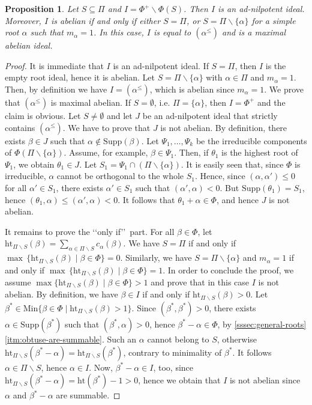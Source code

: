 \documentclass[10pt]{amsart}
\newtheorem{pro}[thm]{Proposition}
\theoremstyle{definition}
\theoremstyle{remark}
\newcommand\smeno{\smallsetminus}
\newcommand\Min{\mathrm{Min}}
\newcommand\supp{\mathrm{Supp}}
\newcommand\alt{\mathrm{ht}}
\newcommand\al{\alpha}
\newcommand\be{\beta}
\renewcommand{\leq}{\leqslant}
\begin{document}
\begin{pro}\label{pro:simple-principal}
Let $S\subseteq\Pi$ and $I=\Phi^+\smeno \Phi(S)$. 
Then $I$ is an ad-nilpotent ideal. 
Moreover, $I$ is abelian if and only if either $S=\Pi$, or $S=\Pi\smeno\{\al\} $ for  a simple root $\al$ such that $m_\al=1$. 
In this case, $I$ is equal to $(\alpha^\leq)$ and is a maximal abelian ideal.
\end{pro}

\begin{proof}
It is immediate that  $I$ is an ad-nilpotent ideal. 
If $S=\Pi$, then $I$ is the empty root ideal, hence it is abelian. 
Let  $S=\Pi\smeno \{\al\}$ with $\al\in \Pi$ and $m_\al=1$. 
Then, by definition we have $I=(\al^\leq)$, which is abelian  since $m_\al=1$.
We prove that $(\al^\leq)$ is maximal abelian. 
If $S= \emptyset$, i.e. $\Pi=\{\al\}$,  then $I=\Phi^+$ and the claim is obvious. 
Let $S\neq \emptyset$ and let $J$ be an ad-nilpotent ideal that strictly contains $(\al^\leq)$.
We have to prove that $J$ is not abelian. 
By definition, there exists $\be\in J$ such that $\al\not\in\supp(\be)$.
Let $\Psi_1, \dots, \Psi_k$ be the irreducible components of $\Phi(\Pi\smeno \{\al\})$. 
Assume, for example, $\be\in \Psi_1$. 
Then, if  $\theta_1$ is the highest root of $\Psi_1$, we obtain $\theta_1\in J$.  
Let $S_1=\Psi_1\cap (\Pi\smeno\{\al\})$.
It is easily seen that, since $\Phi$ is irreducible, $\al$ cannot be orthogonal to the whole $S_1$. 
Hence, since $(\al, \al')\leq 0$ for all $\al'\in S_1$, there exists $\al'\in S_1$ such that $(\al',\al)< 0$. 
But $\supp(\theta_1)=S_1$, hence $(\theta_1,\al)\leq (\al', \al)< 0$. It follows that $\theta_1+\al\in \Phi$, and hence $J$ is not abelian.  

\par
It remains to prove the \lq\lq only if\rq\rq\ part. 
For all $\be\in \Phi$, let $\alt_{\Pi\smeno S}(\be)=\sum\limits_{\al\in\Pi\smeno S}c_\al(\be)$.
We have $S=\Pi$ if and only if  $\max\,\{\alt_{\Pi\smeno S}(\be)\mid\be\in \Phi\}=0$.
Similarly, we have $S=\Pi\smeno \{\al\}$ and $m_\al=1$ if and only if  $\max\,\{\alt_{\Pi\smeno S}(\be)\mid\be\in \Phi\}= 1$.
In order to conclude the proof, we assume $\max\{\alt_{\Pi\smeno S}(\be)\mid\be\in \Phi\}> 1$ and  prove that in this case $I$ is not abelian.
By definition, we have $\be\in I$ if and only if  $\alt_{\Pi\smeno S}(\be)>0$.
Let $\be^*\in \Min\{\be\in \Phi \mid \alt_{\Pi\smeno S}(\be)>1\}$. 
Since $(\be^*, \be^*)> 0$, there exists $\al\in \supp(\be^*)$ such that $(\be^*, \al)>0$, hence $\be^*-\al\in \Phi$, by \ref{sssec:general-roots}\ref{itm:obtuse-are-summable}. 
Such an $\al$ cannot belong to $S$, otherwise $\alt_{\Pi\smeno S}(\be^*-\al)=\alt_{\Pi\smeno S}(\be^*)$, contrary to minimality of $\be^*$. 
It follows $\al\in \Pi\smeno S$, hence $\al\in I$.
Now, $\be^*-\al\in I$, too, since $\alt_{\Pi\smeno S}(\be^*-\al)=\alt(\be^*)-1>0$, hence we obtain that $I$ is not abelian since $\al$ and $\be^*-\al$ are summable. 
\end{proof}
\end{document}
